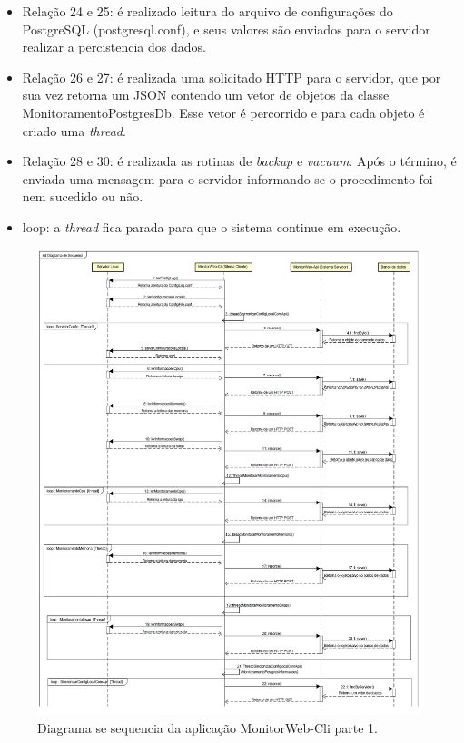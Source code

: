 \begin{itemize}
	\item Relação 24 e 25: é realizado leitura do arquivo de configurações do PostgreSQL (postgresql.conf), e seus valores são enviados para o servidor realizar a percistencia dos dados.
	
	\item Relação 26 e 27: é realizada uma solicitado HTTP para o servidor, que por sua vez retorna um JSON contendo um vetor de objetos da classe MonitoramentoPostgresDb. Esse vetor é percorrido e para cada objeto é criado uma \textit{thread}.
	
	\item Relação 28 e 30: é realizada as rotinas de \textit{backup} e \textit{vacuum}. Após o término, é enviada uma mensagem para o servidor informando se o procedimento foi nem sucedido ou não.
	
	\item loop: a \textit{thread} fica parada para que o sistema continue em execução.
	

\end{itemize}

\begin{figure}[H]
	\centering
	\includegraphics[width=1.0\textwidth]{figuras/diagramaSequencia1.jpg}
	\caption[Diagrama se sequencia da aplicação MonitorWeb-Cli parte 1.]{Diagrama se sequencia da aplicação MonitorWeb-Cli parte 1.}
	\label{Img:MonitorWeb-Cli-DiagramaDeSequencia}
\end{figure}

